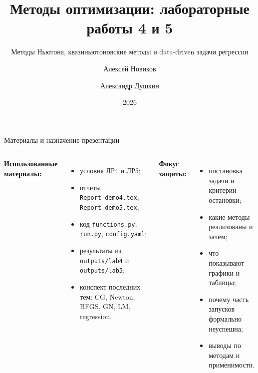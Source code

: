 \documentclass[10pt,aspectratio=169]{beamer}
\title[ЛР4 и ЛР5]{Методы оптимизации: лабораторные работы 4 и 5}
\subtitle{Методы Ньютона, квазиньютоновские методы и data-driven задачи регрессии}
\author[А. Новиков, А. Душкин]{Алексей Новиков \and Александр Душкин}
\institute{Университет ИТМО · Курс «Методы оптимизации»}
\date{2026}
\begin{document}
\begin{frame}
    \titlepage
\end{frame}

\begin{frame}{Материалы и назначение презентации}
\begin{columns}[T,onlytextwidth]
\textbf{Использованные материалы:}
\begin{itemize}
    \item условия ЛР4 и ЛР5;
    \item отчеты \texttt{Report\_demo4.tex}, \texttt{Report\_demo5.tex};
    \item код \texttt{functions.py}, \texttt{run.py}, \texttt{config.yaml};
    \item результаты из \texttt{outputs/lab4} и \texttt{outputs/lab5};
    \item конспект последних тем: CG, Newton, BFGS, GN, LM, regression.
\end{itemize}
\textbf{Фокус защиты:}
\begin{itemize}
    \item постановка задачи и критерии остановки;
    \item какие методы реализованы и зачем;
    \item что показывают графики и таблицы;
    \item почему часть запусков формально неуспешна;
    \item выводы по методам и применимости.
\end{itemize}
\end{columns}
\end{frame}
\end{document}
